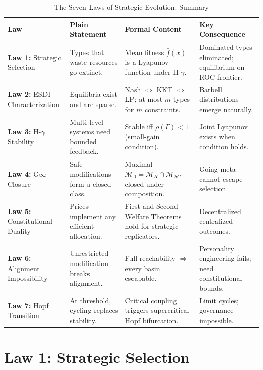 \documentclass[12pt]{article}
\begin{document}
\begin{table}[h]
\centering
\caption{The Seven Laws of Strategic Evolution: Summary}
\label{tab:seven-laws-summary}
\begin{tabular}{@{}p{2.8cm}p{4.2cm}p{4.2cm}p{3cm}@{}}
\toprule
\textbf{Law} & \textbf{Plain Statement} & \textbf{Formal Content} & \textbf{Key Consequence} \\
\midrule
\textbf{Law 1:} Strategic Selection & Types that waste resources go extinct. & Mean fitness $\bar{f}(x)$ is a Lyapunov function under H-$\gamma$. & Dominated types eliminated; equilibrium on ROC frontier. \\
\addlinespace
\textbf{Law 2:} ESDI Characterization & Equilibria exist and are sparse. & Nash $\Leftrightarrow$ KKT $\Leftrightarrow$ LP; at most $m$ types for $m$ constraints. & Barbell distributions emerge naturally. \\
\addlinespace
\textbf{Law 3:} H-$\gamma$ Stability & Multi-level systems need bounded feedback. & Stable iff $\rho(\Gamma) < 1$ (small-gain condition). & Joint Lyapunov exists when condition holds. \\
\addlinespace
\textbf{Law 4:} G$\infty$ Closure & Safe modifications form a closed class. & Maximal $\mathcal{M}_0 = \mathcal{M}_R \cap \mathcal{M}_{SG}$ closed under composition. & Going meta cannot escape selection. \\
\addlinespace
\textbf{Law 5:} Constitutional Duality & Prices implement any efficient allocation. & First and Second Welfare Theorems hold for strategic replicators. & Decentralized = centralized outcomes. \\
\addlinespace
\textbf{Law 6:} Alignment Impossibility & Unrestricted modification breaks alignment. & Full reachability $\Rightarrow$ every basin escapable. & Personality engineering fails; need constitutional bounds. \\
\addlinespace
\textbf{Law 7:} Hopf Transition & At threshold, cycling replaces stability. & Critical coupling triggers supercritical Hopf bifurcation. & Limit cycles; governance impossible. \\
\bottomrule
\end{tabular}
\end{table}


\section{Law 1: Strategic Selection}
\label{sec:law1}
\end{document}

